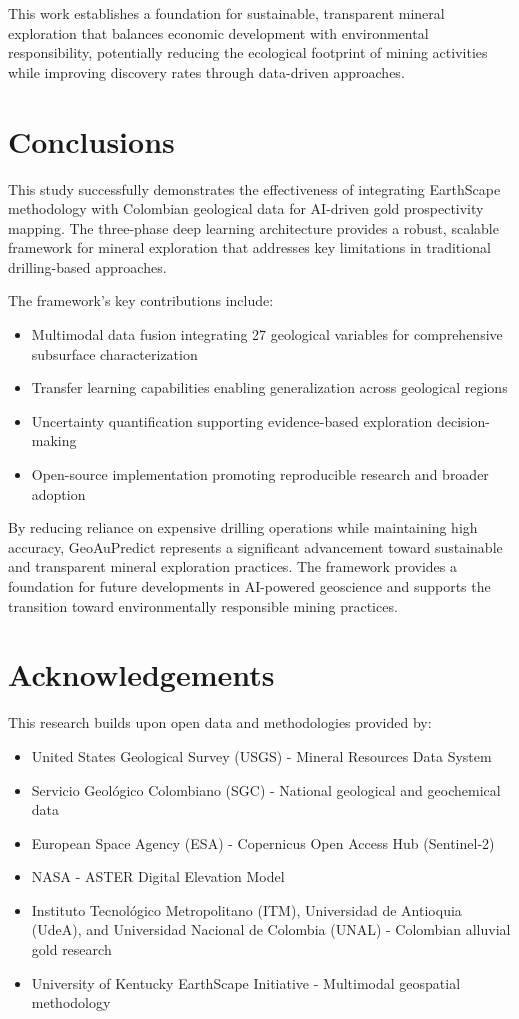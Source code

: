 \documentclass[12pt,a4paper]{article}
\begin{document}
This work establishes a foundation for sustainable, transparent mineral exploration that balances economic development with environmental responsibility, potentially reducing the ecological footprint of mining activities while improving discovery rates through data-driven approaches.

\section{Conclusions}

This study successfully demonstrates the effectiveness of integrating EarthScape methodology with Colombian geological data for AI-driven gold prospectivity mapping. The three-phase deep learning architecture provides a robust, scalable framework for mineral exploration that addresses key limitations in traditional drilling-based approaches.

The framework's key contributions include:
\begin{itemize}
    \item Multimodal data fusion integrating 27 geological variables for comprehensive subsurface characterization
    \item Transfer learning capabilities enabling generalization across geological regions
    \item Uncertainty quantification supporting evidence-based exploration decision-making
    \item Open-source implementation promoting reproducible research and broader adoption
\end{itemize}

By reducing reliance on expensive drilling operations while maintaining high accuracy, GeoAuPredict represents a significant advancement toward sustainable and transparent mineral exploration practices. The framework provides a foundation for future developments in AI-powered geoscience and supports the transition toward environmentally responsible mining practices.

\section{Acknowledgements}

This research builds upon open data and methodologies provided by:
\begin{itemize}
    \item United States Geological Survey (USGS) - Mineral Resources Data System
    \item Servicio Geológico Colombiano (SGC) - National geological and geochemical data
    \item European Space Agency (ESA) - Copernicus Open Access Hub (Sentinel-2)
    \item NASA - ASTER Digital Elevation Model
    \item Instituto Tecnológico Metropolitano (ITM), Universidad de Antioquia (UdeA), and Universidad Nacional de Colombia (UNAL) - Colombian alluvial gold research
    \item University of Kentucky EarthScape Initiative - Multimodal geospatial methodology
\end{itemize}



\end{document}
